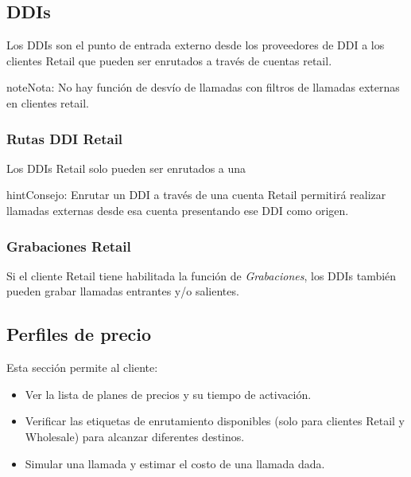 \documentclass[letterpaper,10pt,spanish]{sphinxmanual}
\begin{document}
\subsection{DDIs}
\label{administration_portal/client/retail/ddis:ddis}\label{administration_portal/client/retail/ddis::doc}\label{administration_portal/client/retail/ddis:retail-ddis}
Los DDIs son el punto de entrada externo desde los proveedores de DDI a los clientes Retail que pueden ser enrutados a través de cuentas retail.

\begin{notice}{note}{Nota:}
No hay función de desvío de llamadas con filtros de llamadas externas en clientes retail.
\end{notice}


\subsubsection{Rutas DDI Retail}
\label{administration_portal/client/retail/ddis:retail-ddi-routes}
Los DDIs Retail solo pueden ser enrutados a una {\hyperref[administration_portal/client/retail/retail_accounts:retail\string-accounts]{}}

\begin{notice}{hint}{Consejo:}
Enrutar un DDI a través de una cuenta Retail permitirá realizar llamadas externas desde esa cuenta presentando ese DDI como origen.
\end{notice}


\subsubsection{Grabaciones Retail}
\label{administration_portal/client/retail/ddis:retail-recordings}
Si el cliente Retail tiene habilitada la función de \emph{Grabaciones}, los DDIs también pueden grabar llamadas entrantes y/o salientes.


\subsection{Perfiles de precio}
\label{administration_portal/client/retail/rating_profiles:rating-profiles}\label{administration_portal/client/retail/rating_profiles::doc}
Esta sección permite al cliente:
\begin{itemize}
\item {} 
Ver la lista de planes de precios y su tiempo de activación.

\item {} 
Verificar las etiquetas de enrutamiento disponibles (solo para clientes Retail y Wholesale) para alcanzar diferentes destinos.

\item {} 
Simular una llamada y estimar el costo de una llamada dada.

\end{itemize}
\end{document}
